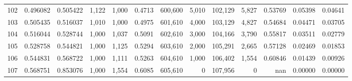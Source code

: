 \begin{tabular}{rrrrrrrrrrrrr}
102 &  0.496082 &  0.505422 &   1,122 &  1,000 &                                     0.4713 &  600,600 &    5,010 &  102,129 &    5,827 &  0.53769 &  0.05398 &  0.04641 \\
103 &  0.505435 &  0.516037 &   1,010 &  1,000 &                                     0.4975 &  601,610 &    4,000 &  103,129 &    4,827 &  0.54684 &  0.04471 &  0.03705 \\
104 &  0.516044 &  0.528744 &   1,000 &  1,037 &                                     0.5091 &  602,610 &    3,000 &  104,166 &    3,790 &  0.55817 &  0.03511 &  0.02779 \\
105 &  0.528758 &  0.544821 &   1,000 &  1,125 &                                     0.5294 &  603,610 &    2,000 &  105,291 &    2,665 &  0.57128 &  0.02469 &  0.01853 \\
106 &  0.544831 &  0.568722 &   1,000 &  1,111 &                                     0.5263 &  604,610 &    1,000 &  106,402 &    1,554 &  0.60846 &  0.01439 &  0.00926 \\
107 &  0.568751 &  0.853076 &   1,000 &  1,554 &                                     0.6085 &  605,610 &        0 &  107,956 &        0 &      nan &  0.00000 &  0.00000 \\
\bottomrule
\end{tabular}
